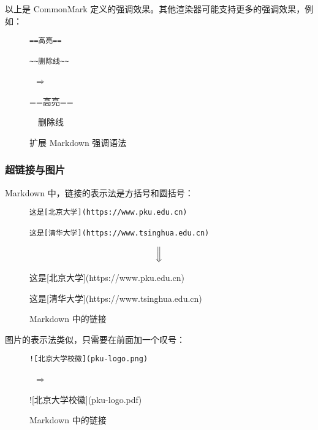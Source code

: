 \documentclass[a4paper,fontset=none]{ctexart}
\begin{document}
以上是 CommonMark 定义的强调效果。其他渲染器可能支持更多的强调效果，例如：

\begin{figure}[H]
    \centering
    \begin{minipage}{0.45\textwidth}
        \begin{verbatim}
==高亮==

~~删除线~~
        \end{verbatim}
    \end{minipage}
    \, $\Longrightarrow$ \,
    \begin{minipage}{0.45\textwidth}
\begin{markdown}
==高亮==

~~删除线~~
\end{markdown}
    \end{minipage}
    \caption{扩展 Markdown 强调语法}
\end{figure}

\subsubsection{超链接与图片}

Markdown 中，链接的表示法是方括号和圆括号：

\begin{figure}[H]
    \centering
    \begin{minipage}{\textwidth}
        \begin{verbatim}
这是[北京大学](https://www.pku.edu.cn)

这是[清华大学](https://www.tsinghua.edu.cn)
        \end{verbatim}
    \end{minipage}
    \[ \Big\Downarrow \]
    \begin{minipage}{\textwidth}
\begin{markdown}
这是[北京大学](https://www.pku.edu.cn)

这是[清华大学](https://www.tsinghua.edu.cn)
\end{markdown}
    \end{minipage}
    \caption{Markdown 中的链接}
\end{figure}

图片的表示法类似，只需要在前面加一个叹号：

\begin{figure}[H]
    \centering
    \begin{minipage}{0.45\textwidth}
        \begin{verbatim}
![北京大学校徽](pku-logo.png)
        \end{verbatim}
    \end{minipage}
    \, $\Longrightarrow$ \,
    \begin{minipage}{0.45\textwidth}
\begin{markdown}
![北京大学校徽](pku-logo.pdf)
\end{markdown}
    \end{minipage}
    \caption{Markdown 中的链接}
\end{figure}
\end{document}
